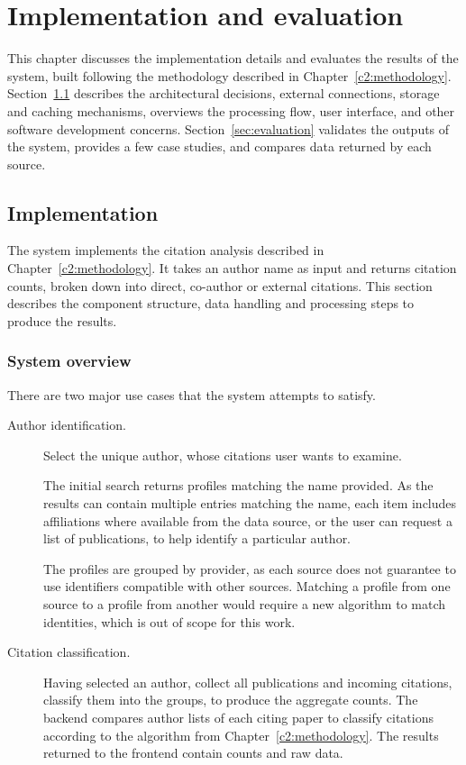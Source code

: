 
\chapter{Implementation and evaluation} \label{c4:implementation-evaluation}

This chapter discusses the implementation details and evaluates the results of the system, built following the methodology described in Chapter~\ref{c2:methodology}.
Section~\ref{sec:implementation} describes the architectural decisions, external connections, storage and caching mechanisms, overviews the processing flow, user interface, and other software development concerns.
Section~\ref{sec:evaluation} validates the outputs of the system, provides a few case studies, and compares data returned by each source.

\section{Implementation} \label{sec:implementation}

The system implements the citation analysis described in Chapter~\ref{c2:methodology}.
It takes an author name as input and returns citation counts, broken down into direct, co-author or external citations.
This section describes the component structure, data handling and processing steps to produce the results.

\subsection{System overview} \label{sec:system-overview}

There are two major use cases that the system attempts to satisfy.

\begin{description}
    \item[Author identification.] Select the unique author, whose citations user wants to examine.

    The initial search returns profiles matching the name provided.
    As the results can contain multiple entries matching the name, each item includes affiliations where available from the data source, or the user can request a list of publications, to help identify a particular author.

    The profiles are grouped by provider, as each source does not guarantee to use identifiers compatible with other sources.
    Matching a profile from one source to a profile from another would require a new algorithm to match identities, which is out of scope for this work.

    \item[Citation classification.] Having selected an author, collect all publications and incoming citations, classify them into the groups, to produce the aggregate counts.
    The backend compares author lists of each citing paper to classify citations according to the algorithm from Chapter~\ref{c2:methodology}.
    The results returned to the frontend contain counts and raw data.
\end{description}


